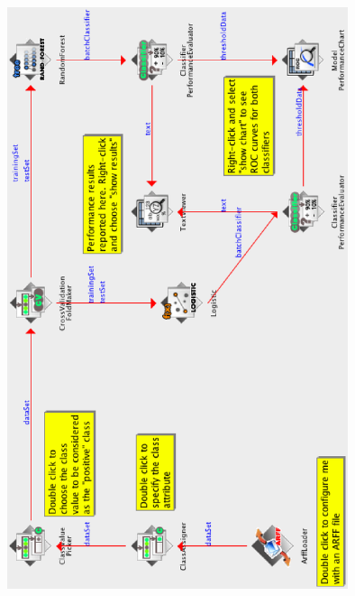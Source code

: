 \begin{center}
  \includegraphics[angle=270,width=10cm]{images/knowledgeflow/example_multiple_roc.eps}
\end{center}

